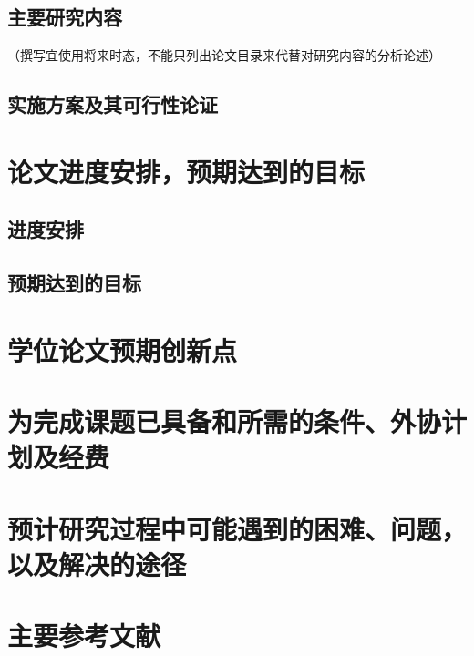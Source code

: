 \subsection{主要研究内容}
（撰写宜使用将来时态，不能只列出论文目录来代替对研究内容的分析论述）
\subsection{实施方案及其可行性论证}
\section{论文进度安排，预期达到的目标}
\subsection{进度安排}
\subsection{预期达到的目标}
\section{学位论文预期创新点}
\section{为完成课题已具备和所需的条件、外协计划及经费}
\section{预计研究过程中可能遇到的困难、问题，以及解决的途径}
\section{主要参考文献}



